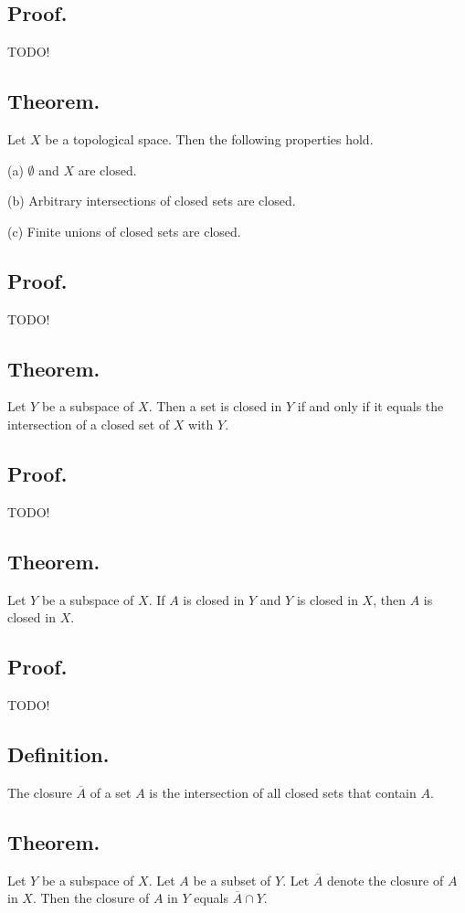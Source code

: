 \documentclass[titlepage]{article}
\begin{document}
\subsection{Proof.} TODO!

\subsection{Theorem.} Let $X$ be a topological space. Then the following properties hold.

(a) $\emptyset$ and $X$ are closed.

(b) Arbitrary intersections of closed sets are closed.

(c) Finite unions of closed sets are closed.

\subsection{Proof.} TODO!

\subsection{Theorem.} Let $Y$ be a subspace of $X$. Then a set is closed in $Y$ if and only if it equals the intersection of a closed set of $X$ with $Y$.

\subsection{Proof.} TODO!

\subsection{Theorem.} Let $Y$ be a subspace of $X$. If $A$ is closed in $Y$ and $Y$ is closed in $X$, then $A$ is closed in $X$.

\subsection{Proof.} TODO!

\subsection{Definition.} The closure $\overline{A}$ of a set $A$ is the intersection of all closed sets that contain $A$.

\subsection{Theorem.} Let $Y$ be a subspace of $X$. Let $A$ be a subset of $Y$. Let $\overline{A}$ denote the closure of $A$ in $X$. Then the closure of $A$ in $Y$ equals $\overline{A} \cap Y$.
\end{document}

